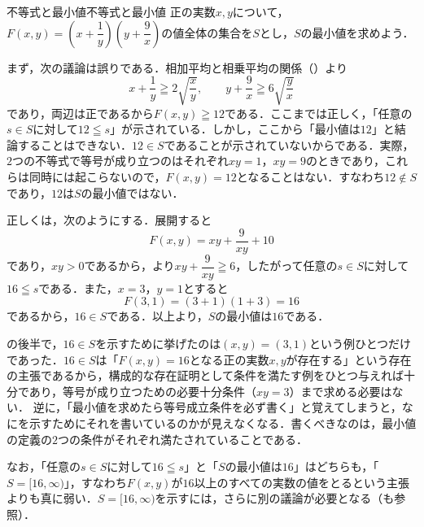 \begin{example}{不等式と最小値}{不等式と最小値}
  正の実数$x,y$について，$F(x, y) = \left( x + \dfrac{1}{y} \right) \left( y + \dfrac{9}{x} \right)$の値全体の集合を$S$とし，$S$の最小値を求めよう．

  まず，次の議論は誤りである．相加平均と相乗平均の関係（）より
  \[
    x + \frac{1}{y} \geqq 2 \sqrt{\frac{x}{y}},
    \qquad
    y + \frac{9}{x} \geqq 6 \sqrt{\frac{y}{x}}
  \]
  であり，両辺は正であるから$F(x, y) \geqq 12$である．ここまでは正しく，「任意の$s \in S$に対して$12 \leqq s$」が示されている．しかし，ここから「最小値は$12$」と結論することはできない．$12 \in S$であることが示されていないからである．実際，$2$つの不等式で等号が成り立つのはそれぞれ$xy = 1$，$xy = 9$のときであり，これらは同時には起こらないので，$F(x, y) = 12$となることはない．すなわち$12 \notin S$であり，$12$は$S$の最小値ではない．

  正しくは，次のようにする．展開すると
  \[
    F(x, y) = xy + \frac{9}{xy} + 10
  \]
  であり，$xy > 0$であるから，より$xy + \dfrac{9}{xy} \geqq 6$，したがって任意の$s \in S$に対して$16 \leqq s$である．また，$x = 3$，$y = 1$とすると
  \[
    F(3, 1) = (3 + 1)(1 + 3) = 16
  \]
  であるから，$16 \in S$である．以上より，$S$の最小値は$16$である．
\end{example}

\begin{remark}[等号成立条件は必要か]
  の後半で，$16 \in S$を示すために挙げたのは$(x, y) = (3, 1)$という例ひとつだけであった．$16 \in S$は「$F(x, y) = 16$となる正の実数$x,y$が存在する」という存在の主張であるから，構成的な存在証明として条件を満たす例をひとつ与えれば十分であり，等号が成り立つための必要十分条件（$xy = 3$）まで求める必要はない．
  逆に，「最小値を求めたら等号成立条件を必ず書く」と覚えてしまうと，なにを示すためにそれを書いているのかが見えなくなる．書くべきなのは，最小値の定義の$2$つの条件がそれぞれ満たされていることである．

  なお，「任意の$s \in S$に対して$16 \leqq s$」と「$S$の最小値は$16$」はどちらも，「$S = [16, \infty)$」，すなわち$F(x, y)$が$16$以上のすべての実数の値をとるという主張よりも真に弱い．$S = [16, \infty)$を示すには，さらに別の議論が必要となる（も参照）．
\end{remark}
